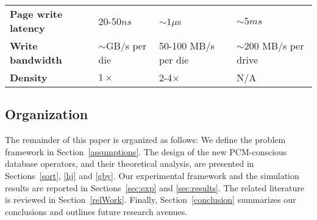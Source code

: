 \begin{table}[!h]
\begin{small}
\begin{tabular}{p{2.25cm}p{1.4cm}p{1.6cm}p{1.6cm}}
  \textbf{Page write latency} & 20-50$ns$ & $\sim 1 \mu$s  & $\sim5ms$ \\                                 
  
  \textbf{Write bandwidth}  & $\sim$GB/s per die & 50-100 MB/s per die  & $\sim$200 MB/s per drive \\ 
  
  \textbf{Density} & $1\times$ & 2-4$\times$ & N/A \\                                                     
  
  \bottomrule                                                                                             
  \end{tabular}                                                                                           
  \end{small}                                                                                             
  \end{table}                        

\subsection*{Organization}
The remainder of this paper is organized as follows: We define the problem
framework in Section~\ref{assumptions}. The design of the new PCM-conscious
database operators, and their theoretical analysis, are presented in
Sections~\ref{sort}, \ref{hj} and \ref{gby}.
Our experimental framework and the simulation results are reported
in Sections~\ref{sec:exp} and \ref{sec:results}.  The related literature is reviewed in
Section~\ref{relWork}.  Finally, Section~\ref{conclusion} summarizes
our conclusions and outlines future research avenues.

